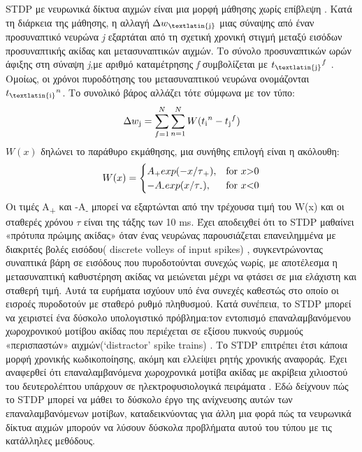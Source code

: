 \documentclass[12pt]{report}
\begin{document}
\textlatin{STDP} με νευρωνικά δίκτυα αιχμών είναι μια μορφή μάθησης χωρίς επίβλεψη . Κατά τη διάρκεια της μάθησης, η αλλαγή \(\Delta w\textsubscript{\textlatin{j}}\) μιας σύναψης από έναν προσυναπτικό νευρώνα \textit{\textlatin{j}} εξαρτάται από τη σχετική χρονική στιγμή μεταξύ εισόδων προσυναπτικής ακίδας και μετασυναπτικών αιχμών. Το σύνολο προσυναπτικών ωρών άφιξης στη σύναψη \textit{\textlatin{j}},με αριθμό καταμέτρησης \textit{\textlatin{f}} συμβολίζεται με \(t\textsubscript{\textlatin{j}}^f\) . 
Ομοίως, οι χρόνοι πυροδότησης του μετασυναπτικού νευρώνα ονομάζονται \(t\textsubscript{\textlatin{i}}^n\). Το συνολικό βάρος αλλάζει τότε \cite{Gerstner1996} σύμφωνα με τον τύπο: 
\begin{equation}
\Delta w\textsubscript{j}=\sum_{f=1}^N\sum_{n=1}^N W(t\textsubscript{i}^n-t\textsubscript{j}^f)
\end{equation}
\(W(x)\) δηλώνει το παράθυρο εκμάθησης, μια συνήθης επιλογή είναι η ακόλουθη:
$$
W(x)=\begin{cases}
			A\textsubscript{+}exp(-x/\tau\textsubscript{+}), & \text{for $x$\textgreater0}\\
            -A\textsubscript{-}exp(x/\tau\textsubscript{-}), & \text{for $x$\textless0}
		 \end{cases}
$$
Οι τιμές A\textsubscript{+} και -A\textsubscript{-} μπορεί να εξαρτώνται από την τρέχουσα τιμή του \textlatin{W}(\textlatin{x}) και οι σταθερές χρόνου \(\tau\) είναι της τάξης των 10 \textlatin{ms}. Έχει αποδειχθεί ότι το \textlatin{STDP} μαθαίνει «πρότυπα πρώιμης ακίδας» όταν ένας νευρώνας παρουσιάζεται επανειλημμένα με διακριτές βολές εισόδου( \textlatin{discrete volleys of input spikes}) , συγκεντρώνοντας συναπτικά βάρη σε εισόδους που πυροδοτούνται συνεχώς νωρίς, με αποτέλεσμα η μετασυναπτική καθυστέρηση ακίδας να μειώνεται μέχρι να φτάσει σε μια ελάχιστη και σταθερή τιμή. Αυτά τα ευρήματα ισχύουν υπό ένα συνεχές καθεστώς στο οποίο οι εισροές πυροδοτούν με σταθερό ρυθμό πληθυσμού. Κατά συνέπεια, το \textlatin{STDP} μπορεί να χειριστεί ένα δύσκολο υπολογιστικό πρόβλημα:τον εντοπισμό επαναλαμβανόμενου χωροχρονικού μοτίβου ακίδας που περιέχεται σε εξίσου πυκνούς συρμούς «περισπαστών» αιχμών(\textlatin{‘distractor' spike trains}) \cite{Masquelier2008}. Το \textlatin{STDP} επιτρέπει έτσι κάποια μορφή χρονικής κωδικοποίησης, ακόμη και ελλείψει ρητής χρονικής αναφοράς. Έχει αναφερθεί ότι επαναλαμβανόμενα χωροχρονικά μοτίβα ακίδας με ακρίβεια χιλιοστού του δευτερολέπτου υπάρχουν σε ηλεκτροφυσιολογικά πειράματα \cite{Fellous2004}. Εδώ \cite{Masquelier2008} δείχνουν πώς το \textlatin{STDP} μπορεί να μάθει το δύσκολο έργο της ανίχνευσης αυτών των επαναλαμβανόμενων μοτίβων, καταδεικνύοντας για άλλη μια φορά πώς τα νευρωνικά δίκτυα αιχμών μπορούν να λύσουν δύσκολα προβλήματα αυτού του τύπου με τις κατάλληλες μεθόδους.
\end{document}
